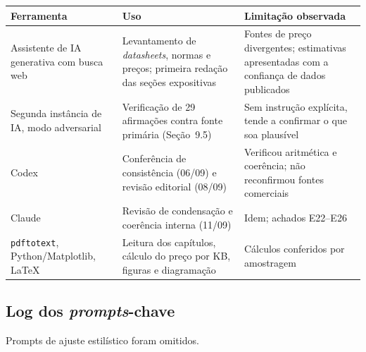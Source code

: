 \documentclass[11pt,a4paper]{article}
\begin{document}
\begin{center}\small
\begin{tabular}{@{}p{4.2cm}p{5.4cm}p{4.4cm}@{}}
\toprule
\textbf{Ferramenta} & \textbf{Uso} & \textbf{Limitação observada} \\
\midrule
Assistente de IA generativa com busca web & Levantamento de \emph{datasheets}, normas e preços; primeira redação das seções expositivas & Fontes de preço divergentes; estimativas apresentadas com a confiança de dados publicados \\
Segunda instância de IA, modo adversarial & Verificação de 29 afirmações contra fonte primária (Seção~9.5) & Sem instrução explícita, tende a confirmar o que soa plausível \\
Codex & Conferência de consistência (06/09) e revisão editorial (08/09) & Verificou aritmética e coerência; não reconfirmou fontes comerciais \\
Claude & Revisão de condensação e coerência interna (11/09) & Idem; achados E22--E26 \\
\texttt{pdftotext}, Python/Matplotlib, \LaTeX & Leitura dos capítulos, cálculo do preço por KB, figuras e diagramação & Cálculos conferidos por amostragem \\
\bottomrule
\end{tabular}
\end{center}

\subsection{Log dos \emph{prompts}-chave}

Prompts de ajuste estilístico foram omitidos.
\end{document}
